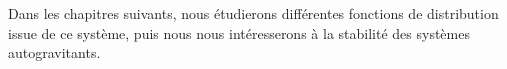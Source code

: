 Dans les chapitres suivants, nous étudierons différentes fonctions de distribution issue de ce système, puis nous nous intéresserons à la stabilité
des systèmes autogravitants.






